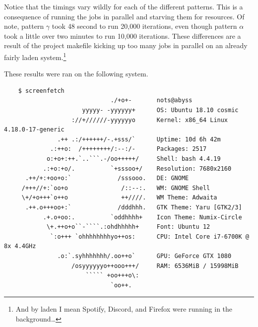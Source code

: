 Notice that the timings vary wildly for each of the different patterns.
This is a consequence of running the jobs in parallel and starving them for resources.
Of note, pattern $\gamma$ took 48 second to run 20,000 iterations, even though pattern $\alpha$ took a little over two minutes to run 10,000 iterations.
These differences are a result of the project makefile kicking up too many jobs in parallel on an already fairly laden system.\footnote{And by laden I mean Spotify, Discord, and Firefox were running in the background\dots}

These results were ran on the following system.

\begin{listing}[h]
    \begin{verbatim}
    $ screenfetch
                              ./+o+-       nots@abyss
                      yyyyy- -yyyyyy+      OS: Ubuntu 18.10 cosmic
                   ://+//////-yyyyyyo      Kernel: x86_64 Linux 4.18.0-17-generic
               .++ .:/++++++/-.+sss/`      Uptime: 10d 6h 42m
             .:++o:  /++++++++/:--:/-      Packages: 2517
            o:+o+:++.`..```.-/oo+++++/     Shell: bash 4.4.19
           .:+o:+o/.          `+sssoo+/    Resolution: 7680x2160
      .++/+:+oo+o:`             /sssooo.   DE: GNOME
     /+++//+:`oo+o               /::--:.   WM: GNOME Shell
     \+/+o+++`o++o               ++////.   WM Theme: Adwaita
      .++.o+++oo+:`             /dddhhh.   GTK Theme: Yaru [GTK2/3]
           .+.o+oo:.          `oddhhhh+    Icon Theme: Numix-Circle
            \+.++o+o``-````.:ohdhhhhh+     Font: Ubuntu 12
             `:o+++ `ohhhhhhhhyo++os:      CPU: Intel Core i7-6700K @ 8x 4.4GHz
               .o:`.syhhhhhhh/.oo++o`      GPU: GeForce GTX 1080
                   /osyyyyyyo++ooo+++/     RAM: 6536MiB / 15998MiB
                       ````` +oo+++o\:
                              `oo++.
    \end{verbatim}
\end{listing}

